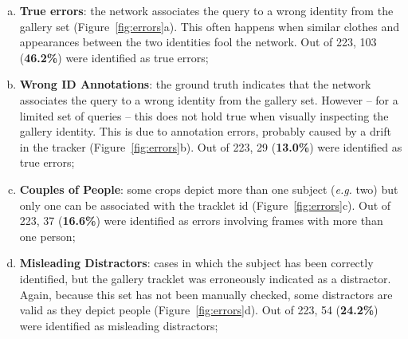 \documentclass[runningheads]{llncs}
\begin{document}
\begin{enumerate}[a)]
    \item \textbf{True errors}: the network associates the query to a wrong identity from the gallery set (Figure~\ref{fig:errors}a). This often happens when similar clothes and appearances between the two identities fool the network. Out of 223, 103 (\textbf{46.2\%}) were identified as true errors;
    \item \textbf{Wrong ID Annotations}: the ground truth indicates that the network associates the query to a wrong identity from the gallery set. However -- for a limited set of queries -- this does not hold true when visually inspecting the gallery identity. This is due to annotation errors, probably caused by a drift in the tracker (Figure~\ref{fig:errors}b). Out of 223, 29 (\textbf{13.0\%}) were identified as true errors; 
    \item \textbf{Couples of People}: some crops depict more than one subject (\textit{e.g.} two) but only one can be associated with the tracklet id (Figure~\ref{fig:errors}c). Out of 223, 37 (\textbf{16.6\%}) were identified as errors involving frames with more than one person;
    \item \textbf{Misleading Distractors}: cases in which the subject has been correctly identified, but the gallery tracklet was erroneously indicated as a distractor. Again, because this set has not been manually checked, some distractors are valid as they depict people (Figure~\ref{fig:errors}d). Out of 223, 54 (\textbf{24.2\%}) were identified as misleading distractors;
\end{enumerate}
\end{document}
